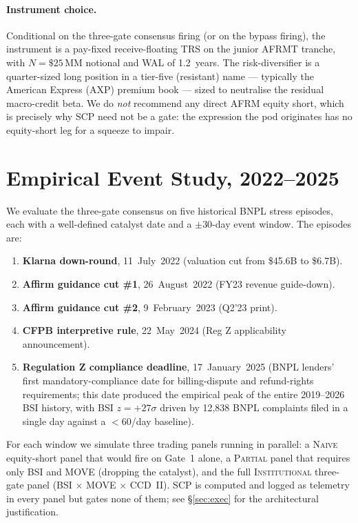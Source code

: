 \documentclass[11pt,letterpaper]{article}
\begin{document}
\paragraph{Instrument choice.}
Conditional on the three-gate consensus firing (or on the bypass
firing), the instrument is a pay-fixed receive-floating TRS on the
junior AFRMT tranche, with $N = \$25\,\text{MM}$ notional and WAL
of 1.2~years. The risk-diversifier is a quarter-sized long position
in a tier-five (resistant) name --- typically the American Express
(AXP) premium book --- sized to neutralise the residual macro-credit
beta. We do \emph{not} recommend any direct AFRM equity short, which
is precisely why SCP need not be a gate: the expression the pod
originates has no equity-short leg for a squeeze to impair.


\section{Empirical Event Study, 2022--2025}
\label{sec:empirical}

We evaluate the three-gate consensus on five historical BNPL stress
episodes, each with a well-defined catalyst date and a $\pm30$-day
event window. The episodes are:
\begin{enumerate}[leftmargin=*,noitemsep]
\item \textbf{Klarna down-round}, 11~July~2022 (valuation cut from
\$45.6B to \$6.7B).
\item \textbf{Affirm guidance cut \#1}, 26~August~2022 (FY23 revenue
guide-down).
\item \textbf{Affirm guidance cut \#2}, 9~February~2023 (Q2'23 print).
\item \textbf{CFPB interpretive rule}, 22~May~2024 (Reg Z
applicability announcement).
\item \textbf{Regulation Z compliance deadline}, 17~January~2025
(BNPL lenders' first mandatory-compliance date for billing-dispute and
refund-rights requirements; this date produced the empirical peak of
the entire 2019--2026 BSI history, with BSI $z = +27\sigma$ driven by
12{,}838 BNPL complaints filed in a single day against a
$<$60/day baseline).
\end{enumerate}

For each window we simulate three trading panels running in parallel:
a \textsc{Naive} equity-short panel that would fire on Gate~1 alone,
a \textsc{Partial} panel that requires only BSI and MOVE (dropping
the catalyst), and the full \textsc{Institutional} three-gate panel
(BSI $\times$ MOVE $\times$ CCD~II). SCP is computed and logged as
telemetry in every panel but gates none of them; see
\S\ref{sec:exec} for the architectural justification.
\end{document}
